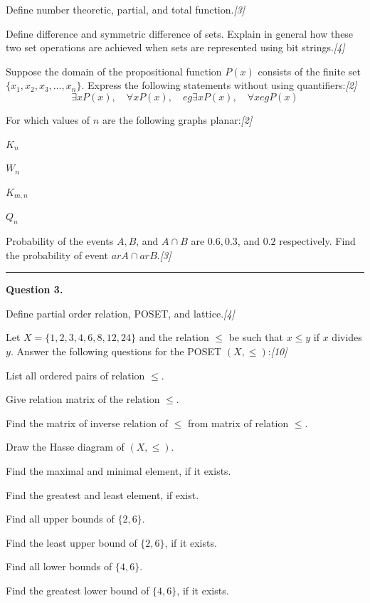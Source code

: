 \documentclass[11pt,a4paper]{article}
\newcommand{\pts}[1]{\hfill   \textit{[#1]}}
\begin{document}
\begin{parts}
  \item Define number theoretic, partial, and total function.\pts{3}
  \item Define difference and symmetric difference of sets. Explain in general how these two set operations are achieved when sets are represented using bit strings.\pts{4}
  \item Suppose the domain of the propositional function $P(x)$ consists of the finite set $\{x_1, x_2, x_3, \dots, x_n\}$. Express the following statements without using quantifiers:\pts{2}
  \[
    \exists x P(x), \quad \forall x P(x), \quad 
eg \exists x P(x), \quad \forall x 
eg P(x)
  \]
  \item For which values of $n$ are the following graphs planar:\pts{2}
  
\begin{parts}
    \item $K_n$
    \item $W_n$
    \item $K_{m,n}$
    \item $Q_n$
  \end{parts}
  \item Probability of the events $A, B$, and $A \cap B$ are $0.6, 0.3$, and $0.2$ respectively. Find the probability of event $ar{A} \cap ar{B}$.\pts{3}
\end{parts}

\medskip\rule{\linewidth}{0.2pt}\medskip




\noindent   \textbf{Question 3.}

\begin{parts}
  \item Define partial order relation, POSET, and lattice.\pts{4}
  \item Let $X = \{1, 2, 3, 4, 6, 8, 12, 24\}$ and the relation $\le$ be such that $x \le y$ if $x$ divides $y$. Answer the following questions for the POSET $(X, \le)$:\pts{10}
  
\begin{parts}
    \item List all ordered pairs of relation $\le$.
    \item Give relation matrix of the relation $\le$.
    \item Find the matrix of inverse relation of $\le$ from matrix of relation $\le$.
    \item Draw the Hasse diagram of $(X, \le)$.
    \item Find the maximal and minimal element, if it exists.
    \item Find the greatest and least element, if exist.
    \item Find all upper bounds of $\{2, 6\}$.
    \item Find the least upper bound of $\{2, 6\}$, if it exists.
    \item Find all lower bounds of $\{4, 6\}$.
    \item Find the greatest lower bound of $\{4, 6\}$, if it exists.
  \end{parts}
\end{parts}
\end{document}
